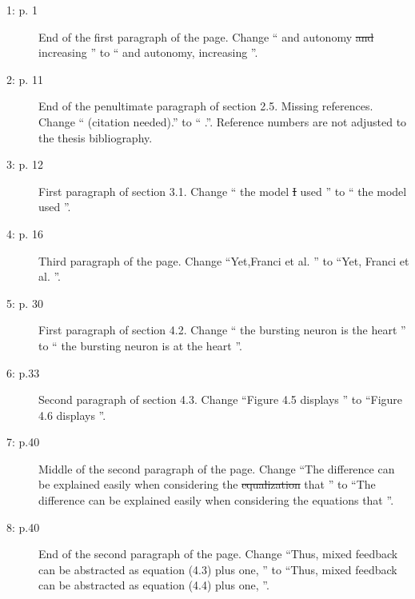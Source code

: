 \documentclass[12pt]{article}
\title{\mytitle}
\author{\myname}
\begin{document}
    \maketitle
    
    \begin{description}
        \item[1: p. 1] End of the first paragraph of the page. Change \enquote{\textelp{} and autonomy \sout{and} increasing \textelp{}} to \enquote{\textelp{} and autonomy, increasing \textelp{}}.
        
        \item[2: p. 11] End of the penultimate paragraph of section 2.5. Missing references. Change \enquote{\textelp{} (citation needed).} to \enquote{\textelp{} \citep{errata1,errata2,errata3}.}. Reference numbers are not adjusted to the thesis bibliography.
        
        \item[3: p. 12] First paragraph of section 3.1. Change \enquote{\textelp{} the model \sout{I} used \textelp{}} to \enquote{\textelp{} the model used \textelp{}}.
        
        \item[4: p. 16] Third paragraph of the page. Change \enquote{Yet,Franci et al. \textelp{}} to \enquote{Yet, Franci et al. \textelp{}}.
        
        \item[5: p. 30] First paragraph of section 4.2. Change \enquote{\textelp{} the bursting neuron is the heart \textelp{}} to \enquote{\textelp{} the bursting neuron is at the heart \textelp{}}.
        
        \item[6: p.33] Second paragraph of section 4.3. Change \enquote{Figure 4.5 displays \textelp{}} to \enquote{Figure 4.6 displays \textelp{}}.
        
        \item[7: p.40] Middle of the second paragraph of the page. Change \enquote{The difference can be explained easily when considering the \sout{equalization} that \textelp{}} to \enquote{The difference can be explained easily when considering the equations that \textelp{}}.
        
        \item[8: p.40] End of the second paragraph of the page. Change \enquote{Thus, mixed feedback can be abstracted as equation (4.3) plus one, \textelp{}} to \enquote{Thus, mixed feedback can be abstracted as equation (4.4) plus one, \textelp{}}.
        

\end{description}
\end{document}
